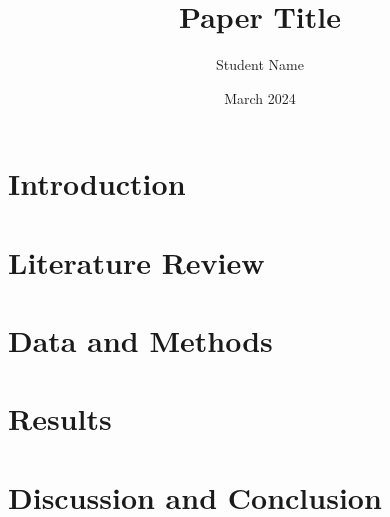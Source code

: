 \documentclass{article}
\title{Paper Title}
\author{Student Name}
\date{March 2024}
\begin{document}
\maketitle

\section{Introduction}
\section{Literature Review}
\section{Data and Methods}
\section{Results}
\section{Discussion and Conclusion}
\end{document}
